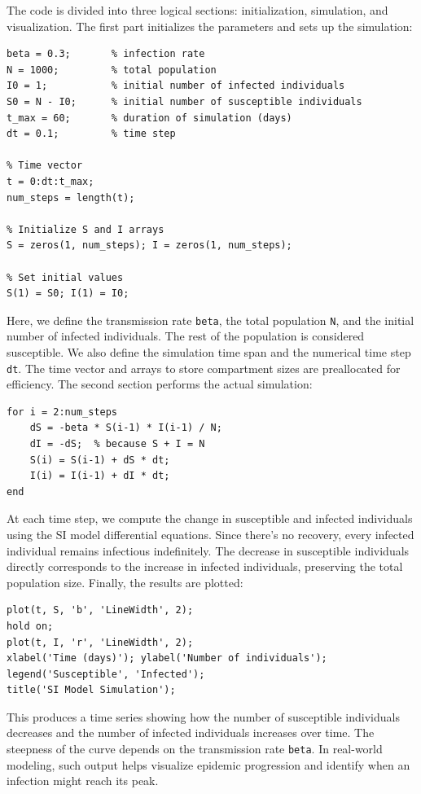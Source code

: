 \documentclass{article}
\begin{document}
The code is divided into three logical sections: initialization, simulation, and visualization. The first part initializes the parameters and sets up the simulation:

\begin{lstlisting}[caption={Initiation}]
% Parameters
beta = 0.3;       % infection rate
N = 1000;         % total population
I0 = 1;           % initial number of infected individuals
S0 = N - I0;      % initial number of susceptible individuals
t_max = 60;       % duration of simulation (days)
dt = 0.1;         % time step

% Time vector
t = 0:dt:t_max;
num_steps = length(t);

% Initialize S and I arrays
S = zeros(1, num_steps); I = zeros(1, num_steps);

% Set initial values
S(1) = S0; I(1) = I0;
\end{lstlisting}

Here, we define the transmission rate \texttt{beta}, the total population \texttt{N}, and the initial number of infected individuals. The rest of the population is considered susceptible. We also define the simulation time span and the numerical time step \texttt{dt}. The time vector and arrays to store compartment sizes are preallocated for efficiency. The second section performs the actual simulation:
\begin{lstlisting}[caption={Simulation loop}]
% Simulation loop 
for i = 2:num_steps
    dS = -beta * S(i-1) * I(i-1) / N;
    dI = -dS;  % because S + I = N
    S(i) = S(i-1) + dS * dt;
    I(i) = I(i-1) + dI * dt;
end
\end{lstlisting}
At each time step, we compute the change in susceptible and infected individuals using the SI model differential equations. Since there's no recovery, every infected individual remains infectious indefinitely. The decrease in susceptible individuals directly corresponds to the increase in infected individuals, preserving the total population size. Finally, the results are plotted:

\begin{lstlisting}[caption={Plotting}]
% Plot results
plot(t, S, 'b', 'LineWidth', 2);
hold on;
plot(t, I, 'r', 'LineWidth', 2);
xlabel('Time (days)'); ylabel('Number of individuals');
legend('Susceptible', 'Infected');
title('SI Model Simulation');
\end{lstlisting}
This produces a time series showing how the number of susceptible individuals decreases and the number of infected individuals increases over time. The steepness of the curve depends on the transmission rate \texttt{beta}. In real-world modeling, such output helps visualize epidemic progression and identify when an infection might reach its peak.
\end{document}
